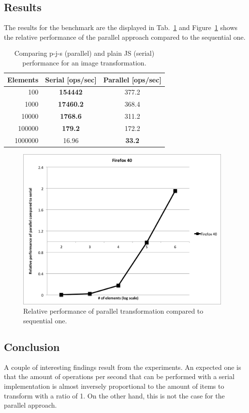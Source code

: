 \documentclass[runningheads,a4paper]{llncs}
\begin{document}
\subsection{Results}
The results for the benchmark are the displayed in Tab.~\ref{tab:benchmark} and Figure~\ref{fig:relative} shows the relative performance of the parallel approach compared to the sequential one.
\begin{table}
  \centering
  \begin{tabular}{|r|c|c|}
    \hline
    Elements & Serial [ops/sec] & Parallel [ops/sec] \\
    \hline
    100 & \textbf{154442} & 377.2\\
    1000 & \textbf{17460.2} &  368.4 \\
    10000 & \textbf{1768.6} & 311.2 \\
    100000 & \textbf{179.2} & 172.2 \\
    1000000 & 16.96 & \textbf{33.2} \\
    \hline
  \end{tabular}
  \caption{Comparing p-j-s (parallel) and plain JS (serial) performance for an image transformation.}
  \label{tab:benchmark}
\end{table}

\begin{figure}
\centering
\includegraphics[height=8.2cm]{comparison}
\caption{Relative performance of parallel transformation compared to sequential one.}
\label{fig:relative}
\end{figure}

\subsection{Conclusion}
A couple of interesting findings result from the experiments. An expected one is that the amount of operations per second that can be performed with a serial implementation is almost inversely proportional to the amount of items to transform with a ratio of 1. On the other hand, this is not the case for the parallel approach.
\end{document}
